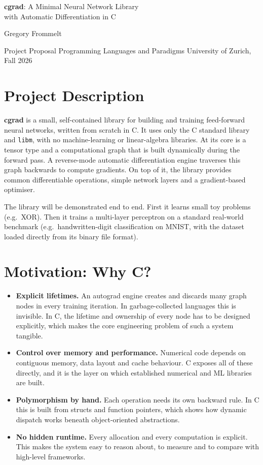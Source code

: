 \documentclass[11pt,a4paper]{article}
\newcommand{\code}[1]{\texttt{#1}}
\begin{document}
\begin{center}
  {\LARGE \textbf{cgrad}: A Minimal Neural Network Library\\[0.2em]
  with Automatic Differentiation in C\par}
  \vspace{0.8em}
  {\large Gregory Frommelt\par}
  \vspace{0.2em}
  {\small Project Proposal \quad Programming Languages and
  Paradigms \quad University of Zurich, Fall 2026\par}
\end{center}

\section{Project Description}

\textbf{cgrad} is a small, self-contained library for building and training
feed-forward neural networks, written from scratch in C. It uses only the C
standard library and \code{libm}, with no machine-learning or linear-algebra
libraries. At its core is a tensor type and a computational graph that is built
dynamically during the forward pass. A reverse-mode automatic differentiation
engine traverses this graph backwards to compute gradients. On top of it, the
library provides common differentiable operations, simple network layers and a
gradient-based optimiser.

The library will be demonstrated end to end. First it learns small toy problems
(e.g.\ XOR). Then it trains a multi-layer perceptron on a standard real-world
benchmark (e.g.\ handwritten-digit classification on MNIST, with the dataset
loaded directly from its binary file format).

\section{Motivation: Why C?}

\begin{itemize}
  \item \textbf{Explicit lifetimes.} An autograd engine creates and discards
    many graph nodes in every training iteration. In garbage-collected
    languages this is invisible. In C, the lifetime and ownership of every node
    has to be designed explicitly, which makes the core engineering problem of
    such a system tangible.
  \item \textbf{Control over memory and performance.} Numerical code depends
    on contiguous memory, data layout and cache behaviour. C exposes all of
    these directly, and it is the layer on which established numerical and ML
    libraries are built.
  \item \textbf{Polymorphism by hand.} Each operation needs its own backward
    rule. In C this is built from structs and function pointers, which shows
    how dynamic dispatch works beneath object-oriented abstractions.
  \item \textbf{No hidden runtime.} Every allocation and every computation is
    explicit. This makes the system easy to reason about, to measure and to
    compare with high-level frameworks.
\end{itemize}
\end{document}
